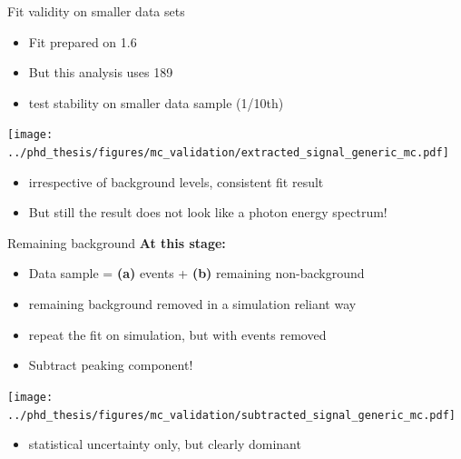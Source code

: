 \documentclass[xcolor=dvipsnames]{beamer}
\begin{document}
\begin{frame}{Fit validity on smaller data sets}
   \scriptsize\centering
   \begin{itemize}
      \item Fit prepared on 1.6~\invab
      \item But this analysis uses 189~\invfb
      \item[\ra] test stability on smaller data sample (1/10th)
   \end{itemize}

      \texttt{[image: ../phd\_thesis/figures/mc\_validation/extracted\_signal\_generic\_mc.pdf]}
  \begin{itemize}
   \item[\ra] irrespective of background levels, consistent fit result
   \item[\ra] But still the result does not look like a photon energy spectrum!   
  \end{itemize}
\end{frame}

\begin{frame}{Remaining background}
\scriptsize\centering
\textbf{At this stage:}
   \begin{itemize}
      \item Data sample = \textbf{(a)} \BtoXsgamma events + \textbf{(b)} remaining non-\BtoXsgamma background
      \item[\ra] remaining background removed in a simulation reliant way
      \item[\ra] repeat the fit on simulation, but with \BtoXsgamma events removed
      \item[\ra] Subtract peaking component!  
   \end{itemize}


   \texttt{[image: ../phd\_thesis/figures/mc\_validation/subtracted\_signal\_generic\_mc.pdf]}

\begin{itemize}
   \item[\ra] statistical uncertainty only, but clearly dominant 
\end{itemize}

\end{frame}
\end{document}
